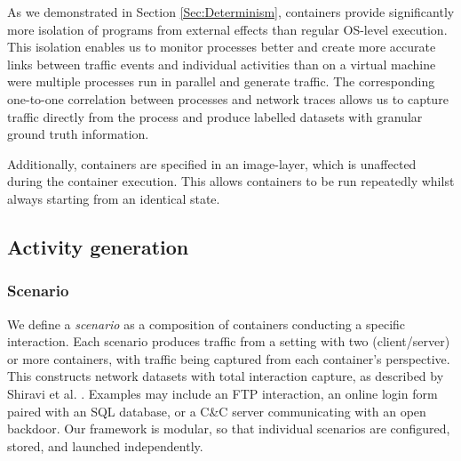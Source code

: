 \documentclass[runningheads]{llncs}
\begin{document}
As we demonstrated in Section \ref{Sec:Determinism}, containers provide significantly more isolation of programs from external effects than regular OS-level execution. This isolation enables us to monitor processes better and create more accurate links between traffic events and individual activities than on a virtual machine were multiple processes run in parallel and generate traffic. The corresponding one-to-one correlation between processes and network traces allows us to capture traffic directly from the process and produce labelled datasets with granular ground truth information.

Additionally, containers are specified in an image-layer, which is unaffected during the container execution. This allows containers to be run repeatedly whilst always starting from an identical state. %

 

\subsection{Activity generation}\label{Sec:Scenarios}

\subsubsection*{Scenario}
We define a \emph{scenario} as a composition of containers conducting a specific interaction. Each scenario produces traffic from a setting with two (client/server) or more containers, with traffic being captured from each container's perspective. This constructs network datasets with total interaction capture, as described by Shiravi et al. \cite{shiravi2012toward}.
Examples may include an FTP interaction, an online login form paired with an SQL database, or a C\&C server communicating with an open backdoor. %
Our framework is modular, so that individual scenarios are configured, stored, and launched independently. %
\end{document}
